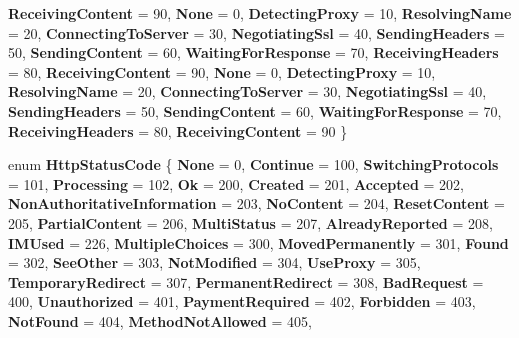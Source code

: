 \begin{DoxyCompactItemize}
{\bfseries Receiving\+Content} = 90, 
{\bfseries None} = 0, 
{\bfseries Detecting\+Proxy} = 10, 
\newline
{\bfseries Resolving\+Name} = 20, 
{\bfseries Connecting\+To\+Server} = 30, 
{\bfseries Negotiating\+Ssl} = 40, 
{\bfseries Sending\+Headers} = 50, 
\newline
{\bfseries Sending\+Content} = 60, 
{\bfseries Waiting\+For\+Response} = 70, 
{\bfseries Receiving\+Headers} = 80, 
{\bfseries Receiving\+Content} = 90, 
\newline
{\bfseries None} = 0, 
{\bfseries Detecting\+Proxy} = 10, 
{\bfseries Resolving\+Name} = 20, 
{\bfseries Connecting\+To\+Server} = 30, 
\newline
{\bfseries Negotiating\+Ssl} = 40, 
{\bfseries Sending\+Headers} = 50, 
{\bfseries Sending\+Content} = 60, 
{\bfseries Waiting\+For\+Response} = 70, 
\newline
{\bfseries Receiving\+Headers} = 80, 
{\bfseries Receiving\+Content} = 90
 \}
\item 
\mbox{\label{namespace_windows_1_1_web_1_1_http_a2378c3ed9d3b208a45e8b6dcc91ea4e4}} 
enum {\bfseries Http\+Status\+Code} \{ \newline
{\bfseries None} = 0, 
{\bfseries Continue} = 100, 
{\bfseries Switching\+Protocols} = 101, 
{\bfseries Processing} = 102, 
\newline
{\bfseries Ok} = 200, 
{\bfseries Created} = 201, 
{\bfseries Accepted} = 202, 
{\bfseries Non\+Authoritative\+Information} = 203, 
\newline
{\bfseries No\+Content} = 204, 
{\bfseries Reset\+Content} = 205, 
{\bfseries Partial\+Content} = 206, 
{\bfseries Multi\+Status} = 207, 
\newline
{\bfseries Already\+Reported} = 208, 
{\bfseries I\+M\+Used} = 226, 
{\bfseries Multiple\+Choices} = 300, 
{\bfseries Moved\+Permanently} = 301, 
\newline
{\bfseries Found} = 302, 
{\bfseries See\+Other} = 303, 
{\bfseries Not\+Modified} = 304, 
{\bfseries Use\+Proxy} = 305, 
\newline
{\bfseries Temporary\+Redirect} = 307, 
{\bfseries Permanent\+Redirect} = 308, 
{\bfseries Bad\+Request} = 400, 
{\bfseries Unauthorized} = 401, 
\newline
{\bfseries Payment\+Required} = 402, 
{\bfseries Forbidden} = 403, 
{\bfseries Not\+Found} = 404, 
{\bfseries Method\+Not\+Allowed} = 405, 
\newline

\end{DoxyCompactItemize}
